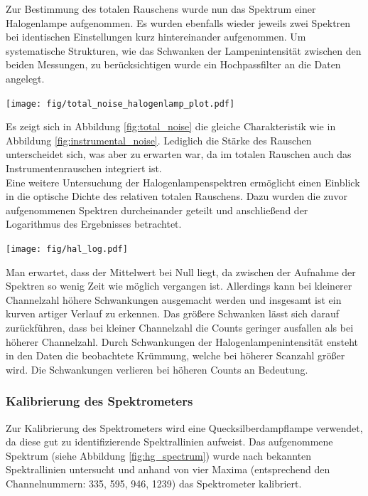 \documentclass[12pt, a4paper, bibliography=totoc]{scrartcl}
\begin{document}
\begin{multicols}{2}
Zur Bestimmung des totalen Rauschens wurde nun das Spektrum einer Halogenlampe aufgenommen.
Es wurden ebenfalls wieder jeweils zwei Spektren bei identischen Einstellungen kurz hintereinander aufgenommen. 
Um systematische Strukturen, wie das Schwanken der Lampenintensität zwischen den beiden Messungen, zu berücksichtigen wurde ein Hochpassfilter an die Daten angelegt.
\begin{center}
	\texttt{[image: fig/total\_noise\_halogenlamp\_plot.pdf]}
	\label{fig:total_noise}
\end{center}  

Es zeigt sich in Abbildung \ref{fig:total_noise} die gleiche Charakteristik wie in Abbildung \ref{fig:instrumental_noise}. Lediglich die Stärke des Rauschen unterscheidet sich, was aber zu erwarten war, da im totalen Rauschen auch das Instrumentenrauschen integriert ist.
\\
Eine weitere Untersuchung der Halogenlampenspektren ermöglicht einen Einblick in die optische Dichte des relativen totalen Rauschens. Dazu wurden die zuvor aufgenommenen Spektren durcheinander geteilt und anschließend der Logarithmus des Ergebnisses betrachtet.

\begin{center}
    \texttt{[image: fig/hal\_log.pdf]}
    \label{fig:hal_log}
\end{center}

Man erwartet, dass der Mittelwert bei Null liegt, da zwischen der Aufnahme der Spektren so wenig Zeit wie möglich vergangen ist. Allerdings kann bei kleinerer Channelzahl höhere Schwankungen ausgemacht werden und insgesamt ist ein kurven artiger Verlauf zu erkennen.
Das größere Schwanken lässt sich darauf zurückführen, dass bei kleiner Channelzahl die Counts geringer ausfallen als bei höherer Channelzahl.
Durch Schwankungen der Halogenlampenintensität ensteht in den Daten die beobachtete Krümmung, welche bei höherer Scanzahl größer wird. Die Schwankungen verlieren bei höheren Counts an Bedeutung.

\subsubsection{Kalibrierung des Spektrometers}\label{sssec:calibrating_the_spectrometer}

Zur Kalibrierung des Spektrometers wird eine Quecksilberdampflampe verwendet, da diese gut zu identifizierende Spektrallinien aufweist.
Das aufgenommene Spektrum (siehe Abbildung \ref{fig:hg_spectrum}) wurde nach bekannten Spektrallinien untersucht und anhand von vier Maxima (entsprechend den Channelnummern: 335, 595, 946, 1239) das Spektrometer kalibriert. 



\end{multicols}
\end{document}
